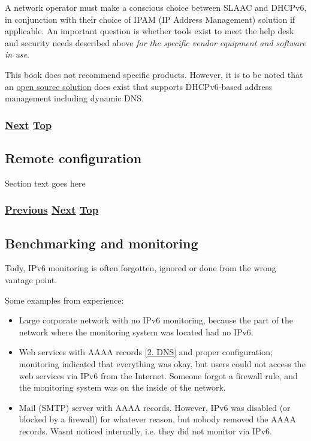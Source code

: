 \documentclass[
]{article}
\begin{document}
A network operator must make a conscious choice between SLAAC and
DHCPv6, in conjunction with their choice of IPAM (IP Address Management)
solution if applicable. An important question is whether tools exist to
meet the help desk and security needs described above \emph{for the
specific vendor equipment and software in use}.

This book does not recommend specific products. However, it is to be
noted that an \href{https://www.isc.org/kea/}{open source solution} does
exist that supports DHCPv6-based address management including dynamic
DNS.

\subsubsection{\texorpdfstring{\hyperref[remote-configuration]{Next}
\hyperref[management-and-operations]{Top}}{Next Top}}\label{next-top-5}

\pagebreak

\subsection{Remote configuration}\label{remote-configuration}

Section text goes here

\subsubsection{\texorpdfstring{\hyperref[address-and-prefix-management]{Previous}
\hyperref[benchmarking-and-monitoring]{Next}
\hyperref[management-and-operations]{Top}}{Previous Next Top}}\label{previous-next-top-26}

\pagebreak

\subsection{Benchmarking and
monitoring}\label{benchmarking-and-monitoring}

Tody, IPv6 monitoring is often forgotten, ignored or done from the wrong
vantage point.

Some examples from experience:

\begin{itemize}
\item
  Large corporate network with no IPv6 monitoring, because the part of
  the network where the monitoring system was located had no IPv6.
\item
  Web services with AAAA records {[}\hyperref[dns]{2. DNS}{]} and proper
  configuration; monitoring indicated that everything was okay, but
  users could not access the web services via IPv6 from the Internet.
  Someone forgot a firewall rule, and the monitoring system was on the
  inside of the network.
\item
  Mail (SMTP) server with AAAA records. However, IPv6 was disabled (or
  blocked by a firewall) for whatever reason, but nobody removed the
  AAAA records. Wasn\textquotesingle t noticed internally, i.e. they did
  not monitor via IPv6.
\end{itemize}
\end{document}
